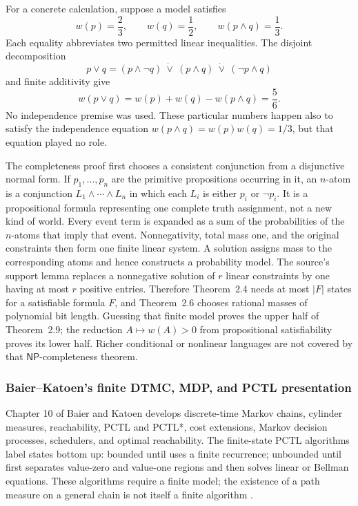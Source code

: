 For a concrete calculation, suppose a model satisfies
\[
 w(p)=\frac23,
 \qquad w(q)=\frac12,
 \qquad w(p\land q)=\frac13.
\]
Each equality abbreviates two permitted linear inequalities.  The disjoint
decomposition
\[
 p\lor q=(p\land\neg q)\ \dot\lor\ (p\land q)\ \dot\lor\
           (\neg p\land q)
\]
and finite additivity give
\[
 w(p\lor q)=w(p)+w(q)-w(p\land q)=\frac56.
\]
No independence premise was used.  These particular numbers happen also to
satisfy the independence equation \(w(p\land q)=w(p)w(q)=1/3\), but that
equation played no role.

The completeness proof first chooses a consistent conjunction from a
disjunctive normal form.  If \(p_1,\ldots,p_n\) are the primitive propositions
occurring in it, an \(n\)-atom is a conjunction
\(L_1\land\cdots\land L_n\) in which each \(L_i\) is either \(p_i\) or
\(\neg p_i\).  It is a propositional formula representing one complete truth
assignment, not a new kind of world.  Every event term is expanded as a sum of
the probabilities of the \(n\)-atoms that imply that event.  Nonnegativity,
total mass one, and the original constraints then form one finite linear
system.  A solution assigns mass to the corresponding atoms and hence
constructs a probability model.
The source's support lemma replaces a nonnegative solution of \(r\) linear
constraints by one having at most \(r\) positive entries.  Therefore
Theorem~2.4 needs at most \(|F|\) states for a satisfiable formula \(F\), and
Theorem~2.6 chooses rational masses of polynomial bit length.  Guessing that
finite model proves the upper half of Theorem~2.9; the reduction
\(A\mapsto w(A)>0\) from propositional satisfiability proves its lower half.
Richer conditional or nonlinear languages are not covered by that
\(\mathsf{NP}\)-completeness theorem.

\subsubsection{Baier--Katoen's finite DTMC, MDP, and PCTL presentation}

Chapter 10 of Baier and Katoen develops discrete-time Markov chains, cylinder
measures, reachability, PCTL and PCTL*, cost extensions, Markov decision
processes, schedulers, and optimal reachability.  The finite-state PCTL
algorithms label states bottom up: bounded until uses a finite recurrence;
unbounded until first separates value-zero and value-one regions and then
solves linear or Bellman equations.  These algorithms require a finite model;
the existence of a path measure on a general chain is not itself a finite
algorithm \cite[ch.~10]{BaierKatoen2008}.

